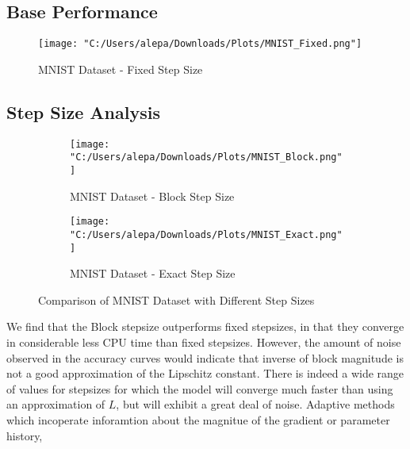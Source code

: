 \documentclass{article}
\begin{document}
\subsection{Base Performance}
\begin{figure}[H]
    \centering
    \texttt{[image: "C:/Users/alepa/Downloads/Plots/MNIST\_Fixed.png"]}
    \caption{MNIST Dataset - Fixed Step Size}
    \label{fig:mnist_fixed}
\end{figure}

\subsection{Step Size Analysis}
\begin{figure}[H]
    \centering
    \begin{subfigure}[b]{0.45\linewidth}
        \centering
        \texttt{[image: "C:/Users/alepa/Downloads/Plots/MNIST\_Block.png"]}
        \caption{MNIST Dataset - Block Step Size}
        \label{fig:mnist_block}
    \end{subfigure}
    \hfill
    \begin{subfigure}[b]{0.45\linewidth}
        \centering
        \texttt{[image: "C:/Users/alepa/Downloads/Plots/MNIST\_Exact.png"]}
        \caption{MNIST Dataset - Exact Step Size}
        \label{fig:mnist_exact}
    \end{subfigure}
    \caption{Comparison of MNIST Dataset with Different Step Sizes}
    \label{fig:mnist_comparison}
\end{figure}

We find that the Block stepsize outperforms fixed stepsizes, in that they converge in considerable less CPU time than fixed stepsizes. However, the amount of noise observed in the accuracy curves would indicate that inverse of block magnitude is not a good approximation of the Lipschitz constant. There is indeed a wide range of values for stepsizes for which the model will converge much faster than using an approximation of $L$, but will exhibit a great deal of noise. Adaptive methods which incoperate inforamtion about the magnitue of the gradient or parameter history,  
\end{document}
